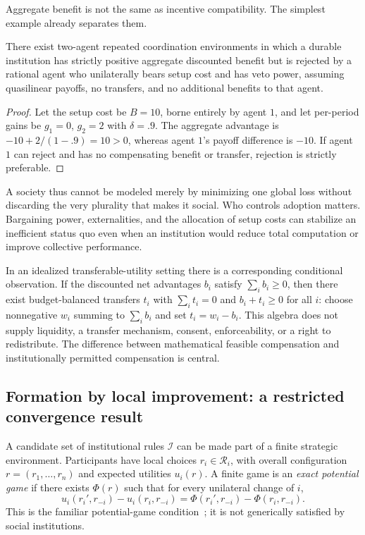 Aggregate benefit is not the same as incentive compatibility. The simplest example already separates them.

\begin{MSproposition}\label{MS:prop:veto}
There exist two-agent repeated coordination environments in which a durable institution has strictly positive aggregate discounted benefit but is rejected by a rational agent who unilaterally bears setup cost and has veto power, assuming quasilinear payoffs, no transfers, and no additional benefits to that agent.
\end{MSproposition}
\begin{proof}
Let the setup cost be $B=10$, borne entirely by agent $1$, and let per-period gains be $g_1=0$, $g_2=2$ with $\delta=.9$. The aggregate advantage is $-10+2/(1-.9)=10>0$, whereas agent $1$'s payoff difference is $-10$. If agent $1$ can reject and has no compensating benefit or transfer, rejection is strictly preferable.
\end{proof}

A society thus cannot be modeled merely by minimizing one global loss without discarding the very plurality that makes it social. Who controls adoption matters. Bargaining power, externalities, and the allocation of setup costs can stabilize an inefficient status quo even when an institution would reduce total computation or improve collective performance.

In an idealized transferable-utility setting there is a corresponding conditional observation. If the discounted net advantages $b_i$ satisfy $\sum_i b_i\ge0$, then there exist budget-balanced transfers $t_i$ with $\sum_i t_i=0$ and $b_i+t_i\ge0$ for all $i$: choose nonnegative $w_i$ summing to $\sum_i b_i$ and set $t_i=w_i-b_i$. This algebra does not supply liquidity, a transfer mechanism, consent, enforceability, or a right to redistribute. The difference between mathematical feasible compensation and institutionally permitted compensation is central.

\subsection{Formation by local improvement: a restricted convergence result}

A candidate set of institutional rules $\mathcal I$ can be made part of a finite strategic environment. Participants have local choices $r_i\in\mathcal R_i$, with overall configuration $r=(r_1,\ldots,r_n)$ and expected utilities $u_i(r)$. A finite game is an \emph{exact potential game} if there exists $\Phi(r)$ such that for every unilateral change of $i$,
\[
u_i(r_i',r_{-i})-u_i(r_i,r_{-i})
=\Phi(r_i',r_{-i})-\Phi(r_i,r_{-i}).
\]
This is the familiar potential-game condition~\cite{MS:monderer}; it is not generically satisfied by social institutions.

